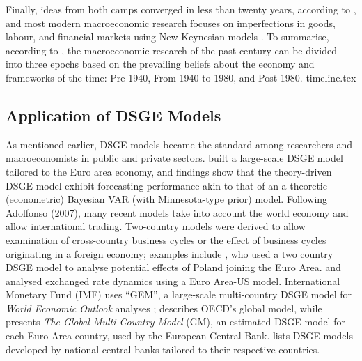 Finally, ideas from both camps converged in less than twenty years, according to \textcite[1388]{blanchard_2000_what}, and most modern macroeconomic research focuses on imperfections in goods, labour, and financial markets using New Keynesian models \parencite{jordigal_2015_monetary}. To summarise, according to \textcite{blanchard_2000_what}, the macroeconomic research of the past century can be divided into three epochs based on the prevailing beliefs about the economy and frameworks of the time: Pre-1940, From 1940 to 1980, and Post-1980.
{timeline.tex}

\subsection{Application of DSGE Models}
As mentioned earlier, DSGE models became the standard among researchers and macroeconomists in public and private sectors. \textcite{smets_2003_an} built a large-scale DSGE model tailored to the Euro area economy, and \textcite[595]{smets_2007_shocks} findings show that the theory-driven DSGE model exhibit forecasting performance akin to that of an a-theoretic (econometric) Bayesian VAR (with Minnesota-type prior) model. Following Adolfonso (2007), many recent models take into account the world economy and allow international trading. Two-country models were derived to allow examination of cross-country business cycles or the effect of business cycles originating in a foreign economy; examples include \textcite{kolasa_2009_structural}, who used a two country DSGE model to analyse potential effects of Poland joining the Euro Area. \textcite{gregorydewalque_2017_an} and \textcite{gunter_2017_estimating} analysed exchanged rate dynamics using a Euro Area-US model. International Monetary Fund (IMF) uses ``GEM'', a large-scale multi-country DSGE model for \textit{World Economic Outlook} analyses \parencite{mrivantchakarov_2004_gem}; \textcite{herv_2011_the} describes OECD's global model, while \textcite{albonico_2019_the} presents \textit{The Global Multi-Country Model} (GM), an estimated DSGE model for each Euro Area country, used by the European Central Bank. \citereset\textcite[3]{albonico_2019_the} lists DSGE models developed by national central banks tailored to their respective countries.


